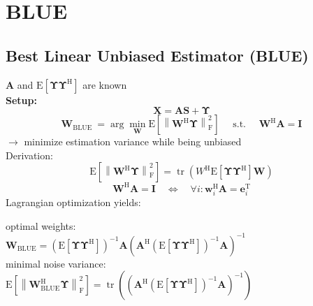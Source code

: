 \documentclass[english]{latex4ei/latex4ei_sheet}
\begin{document}
\section{BLUE}
\begin{sectionbox}
  \subsection{Best Linear Unbiased Estimator (BLUE)}
  $\boldsymbol{A}$ and $\mathrm{E}\left[\boldsymbol{\Upsilon} \boldsymbol{\Upsilon}^{\mathrm{H}}\right]$ are known\\
  \textbf{Setup:}
  $$\boldsymbol{X}=\boldsymbol{A} \boldsymbol{S}+\boldsymbol{\Upsilon}$$
  $$\boldsymbol{W}_{\text {BLUE }}=\arg \min _{\boldsymbol{W}} \mathrm{E}\left[\left\|\boldsymbol{W}^{\mathrm{H}} \boldsymbol{\Upsilon}\right\|_{\mathrm{F}}^{2}\right] \quad \text { s.t. } \quad \boldsymbol{W}^{\mathrm{H}} \boldsymbol{A}=\mathbf{I}$$
  $\rightarrow$ minimize estimation variance while being unbiased\\
  Derivation:
  $$\mathrm{E}\left[\left\|\boldsymbol{W}^{\mathrm{H}} \boldsymbol{\Upsilon}\right\|_{\mathrm{F}}^{2}\right] = \operatorname{tr}\left(W^{\mathrm{H}} \mathrm{E}\left[\boldsymbol{\Upsilon} \boldsymbol{\Upsilon}^{\mathrm{H}}\right] \boldsymbol{W}\right)$$
  $$\boldsymbol{W}^{\mathrm{H}} \boldsymbol{A}=\mathbf{I} \quad \Longleftrightarrow \quad \forall i: \boldsymbol{w}_{i}^{\mathrm{H}} \boldsymbol{A}=\mathbf{e}_{i}^{\mathrm{T}}$$
  Lagrangian optimization yields:
  \begin{emphbox}
    optimal weights:\\
    $\boldsymbol{W}_{\mathrm{BLUE}}=\left(\mathrm{E}\left[\boldsymbol{\Upsilon} \boldsymbol{\Upsilon}^{\mathrm{H}}\right]\right)^{-1} \boldsymbol{A}\left(\boldsymbol{A}^{\mathrm{H}}\left(\mathrm{E}\left[\boldsymbol{\Upsilon} \boldsymbol{\Upsilon}^{\mathrm{H}}\right]\right)^{-1} \boldsymbol{A}\right)^{-1}$\\
    minimal noise variance:\\
    $\mathrm{E}\left[\left\|\boldsymbol{W}_{\mathrm{BLUE}}^{\mathrm{H}} \boldsymbol{\Upsilon}\right\|_{\mathrm{F}}^{2}\right]=\operatorname{tr}\left(\left(\boldsymbol{A}^{\mathrm{H}}\left(\mathrm{E}\left[\boldsymbol{\Upsilon} \boldsymbol{\Upsilon}^{\mathrm{H}}\right]\right)^{-1} \boldsymbol{A}\right)^{-1}\right)$
  \end{emphbox}
  

\end{sectionbox}
\end{document}
